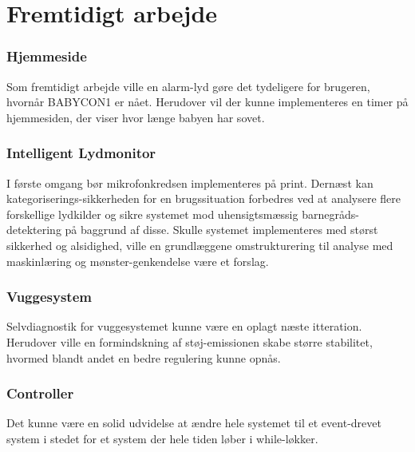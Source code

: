 \chapter{Fremtidigt arbejde}
\label{fremtidigtArbejde}

\subsection*{Hjemmeside}
Som fremtidigt arbejde ville en alarm-lyd gøre det tydeligere for brugeren, hvornår BABYCON1 er nået. Herudover vil der kunne implementeres en timer på hjemmesiden, der viser hvor længe babyen har sovet. 

\subsection*{Intelligent Lydmonitor}
I første omgang bør mikrofonkredsen implementeres på print. Dernæst kan kategoriserings-sikkerheden for en brugssituation forbedres ved at analysere flere forskellige lydkilder og sikre systemet mod uhensigtsmæssig barnegråds-detektering på baggrund af disse. Skulle systemet implementeres med størst sikkerhed og alsidighed, ville en grundlæggene omstrukturering til analyse med maskinlæring og mønster-genkendelse være et forslag.

\subsection*{Vuggesystem}
Selvdiagnostik for vuggesystemet kunne være en oplagt næste itteration. Herudover ville en formindskning af støj-emissionen skabe større stabilitet, hvormed blandt andet en bedre regulering kunne opnås. 

\subsection{Controller}
Det kunne være en solid udvidelse at ændre hele systemet til et event-drevet system i stedet for et system der hele tiden løber i while-løkker.
